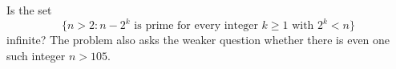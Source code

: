 Is the set
\[
\{n>2: n-2^k\text{ is prime for every integer }k\geq1\text{ with }2^k<n\}
\]
infinite? The problem also asks the weaker question whether there is even one such integer $n>105$.
